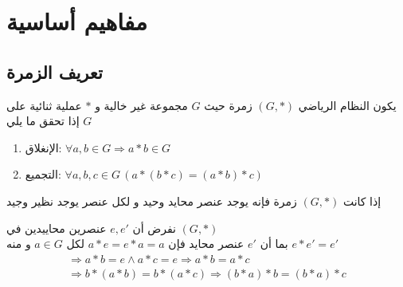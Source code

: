 \chapter{مفاهيم أساسية}

\newpage

\section{تعريف الزمرة}

\begin{definition}
	
	يكون النظام الرياضي \((G, *)\) زمرة حيث \(G\) مجموعة غير خالية و \(*\) عملية ثنائية على \(G\) إذا تحقق ما يلي
	
	\begin{enumerate}
		
		\item الإنغلاق: \(\forall a, b \in G \Rightarrow a * b \in G\)
		
		\item التجميع: \(\forall a, b, c \in G\, (a * (b * c) = (a * b) * c)\)
	\end{enumerate}
	
	
	\begin{theorem}
		
		إذا كانت \((G, *)\) زمرة فإنه يوجد عنصر محايد وحيد و لكل عنصر يوجد نظير وجيد 
		
	\end{theorem}
	
	\begin{myproof}
		نفرض أن \(e, e'\) عنصرين محاييدين في \((G, *)\) \\
		بما أن \(e'\) عنصر محايد فإن \(a * e = e * a = a\) لكل \(a\in G\) و منه \(e * e' = e'\)
		\begin{gather*}
			\Rightarrow a * b = e \wedge a * c = e \Rightarrow a * b = a * c \\
			\Rightarrow b * (a * b) = b * (a * c) \Rightarrow (b * a) * b = (b * a) * c
		\end{gather*}
	\end{myproof}
	
\end{definition}